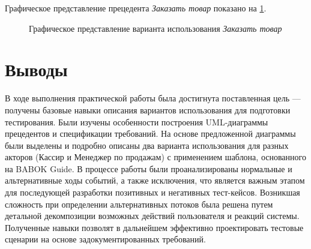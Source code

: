 Графическое представление прецедента \textit{Заказать товар} показано на \cref{fig:uc2_graph}.

\begin{figure}[H]
    \centering
    \caption{Графическое представление варианта использования \textit{Заказать товар}}
    \label{fig:uc2_graph}
\end{figure}

\section*{Выводы}
В ходе выполнения практической работы была достигнута поставленная цель — получены базовые навыки описания вариантов использования для подготовки тестирования. Были изучены особенности построения UML-диаграммы прецедентов и спецификации требований. На основе предложенной диаграммы были выделены и подробно описаны два варианта использования для разных акторов (Кассир и Менеджер по продажам) с применением шаблона, основанного на BABOK Guide. В процессе работы были проанализированы нормальные и альтернативные ходы событий, а также исключения, что является важным этапом для последующей разработки позитивных и негативных тест-кейсов. Возникшая сложность при определении альтернативных потоков была решена путем детальной декомпозиции возможных действий пользователя и реакций системы. Полученные навыки позволят в дальнейшем эффективно проектировать тестовые сценарии на основе задокументированных требований.